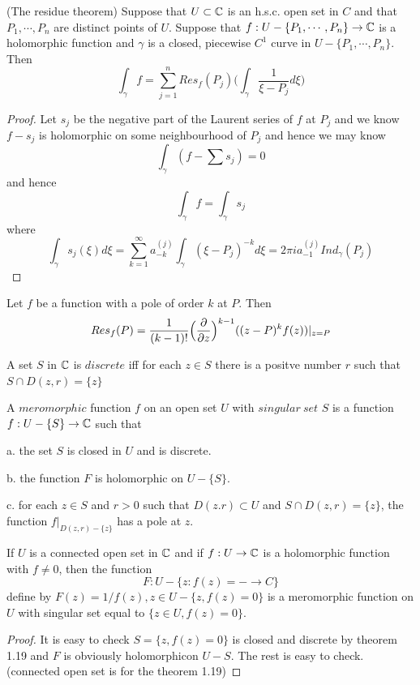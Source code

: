 \begin{theorem}
    (The residue theorem) Suppose that $U\subset \mathbb{C}$ is an h.s.c. open set in $C$ and that $P_1,\cdots,P_n$ are distinct points of $U$. Suppose that $f:U-\{P_1,\cdots,P_n\}\to\mathbb{C}$ is a holomorphic function and $\gamma$ is a closed, piecewise $C^1$ curve in $U-\{P_1,\cdots,P_n\}$. Then
    \[
    \int_{\gamma}f = \sum\limits_{j=1}^n Res_f(P_j)\Big(\int_{\gamma}\dfrac{1}{\xi-P_j}d\xi\Big)
    \]
\end{theorem}
\begin{proof}\par
    Let $s_j$ be the negative part of the Laurent series of $f$ at $P_j$ and we know $f-s_j$ is holomorphic on some neighbourhood of $P_j$ and hence we may know 
    \[
    \int_{\gamma} (f-\sum s_j) = 0
    \]
    and hence
    \[\int_{\gamma} f = \int_{\gamma} s_j\]
    where
    \[\int_{\gamma}s_j(\xi)d\xi = \sum_{k=1}^{\infty} a_{-k}^{(j)}\int_{\gamma}(\xi-P_j)^{-k}d\xi = 2\pi i a_{-1}^{(j)}Ind_{\gamma}(P_j)\]
\end{proof}

\begin{proposition}
    Let $f$ be a function with a pole of order $k$ at $P$. Then
    \[
    Res_f(P) = \dfrac{1}{(k-1)!}\Big(\dfrac{\partial}{\partial z}\Big)^{k-1} ((z-P)^kf(z))|_{z=P}
    \]
\end{proposition}

\begin{definition}
    A set $S$ in $\mathbb{C}$ is $discrete$ iff for each $z\in S$ there is a positve number $r$ such that $S\cap D(z,r) = \{z\}$
\end{definition}

\begin{definition}
    A $meromorphic$ function $f$ on an open set $U$ with $singular\ set$ $S$ is a function $f:U-\{S\} \to \mathbb{C}$ such that\par
    a. the set $S$ is closed in $U$ and is discrete.\par
    b. the function $F$ is holomorphic on $U-\{S\}$.\par
    c. for each $z\in S$ and $r>0$ such that $D(z.r)\subset U$ and $S\cap D(z,r)= \{z\}$, the function $f|_{D(z,r)-\{z\}}$ has a pole at $z$.
\end{definition}

\begin{lemma}
    If $U$ is a connected open set in $\mathbb{C}$ and if $f:U\to\mathbb{C}$ is a holomorphic function with $f\neq 0$, then the function
    \[F:U-\{z:f(z)=-\to C\}\]
    define by $F(z) = 1/f(z), z\in U-\{z,f(z) = 0\}$ is a meromorphic function on $U$ with singular set equal to $\{z\in U, f(z) = 0\}$.
\end{lemma}
\begin{proof}
    It is easy to check $S = \{z,f(z) = 0\}$ is closed and discrete by theorem 1.19 and $F$ is obviously holomorphicon $U-S$. The rest is easy to check.(connected open set is for the theorem 1.19)
\end{proof}

